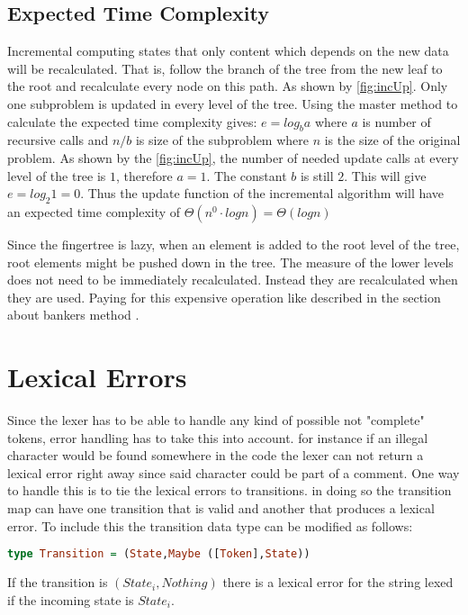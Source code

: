 \subsection{Expected Time Complexity}
Incremental computing states that only content which depends on the new
data will be recalculated. That is, follow the branch of the tree from the new
leaf to the root and recalculate every node on this path. As shown by
\cref{fig:incUp}. Only one subproblem is updated in every level of the tree.
Using the master method to calculate the expected time complexity gives:
$e = log_b a$ where $a$ is number of recursive calls and $n/b$ is size of the
subproblem where $n$ is the size of the original problem. As shown by the
\cref{fig:incUp}, the number of needed update calls at every level of the tree
is $1$, therefore $a = 1$. The constant $b$ is still $2$. This will give
$e = log_2 1 = 0$. Thus the update function of the incremental algorithm will
have an expected time complexity of $\Theta(n^0 \cdot log n) = \Theta(log n)$

Since the fingertree is lazy, when an element is added to the root level of the
tree, root elements might be pushed down in the tree. The measure of the
lower levels does not need to be immediately recalculated. Instead they
are recalculated when they are used. Paying for this expensive operation like
described in the section about bankers method \cite{fingertree}.

\section{Lexical Errors}
Since the lexer has to be able to handle any kind of possible not "complete"
tokens, error handling has to take this into account. for instance if an illegal
character would be found somewhere in the code the lexer can not return a lexical
error right away since said character could be part of a comment. One way to
handle this is to tie the lexical errors to transitions. in doing so the
transition map can have one transition that is valid and another that produces a
lexical error. To include this the transition data type can be modified as
follows:
\begin{lstlisting}[language=Haskell]
type Transition = (State,Maybe ([Token],State))
\end{lstlisting}
If the transition is $(State_i,Nothing)$ there is a lexical error for the string
lexed if the incoming state is $State_i$.


